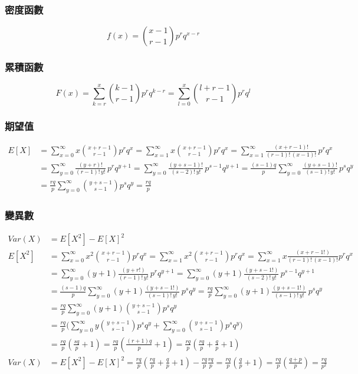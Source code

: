\documentclass{article}
\begin{document}
\subsubsection{密度函數}
\[ f(x)=\binom{x-1}{r-1}p^r q^{x-r} \]

\subsubsection{累積函數}
\[ F(x)=\sum_{k=r}^x{\binom{k-1}{r-1}p^r q^{k-r}}
       =\sum_{l=0}^x{\binom{l+r-1}{r-1}p^r q^l} \]

\subsubsection{期望值}
\begin{align*}
E[X]
& = \sum_{x=0}^\infty{x\binom{x+r-1}{r-1}p^r q^x}
  = \sum_{x=1}^\infty{x\binom{x+r-1}{r-1}p^r q^x}
  = \sum_{x=1}^\infty{\frac{(x+r-1)!}{(r-1)!\,(x-1)!}\,p^r q^x} \\
& = \sum_{y=0}^\infty{\frac{(y+r)!}{(r-1)!\,y!}\,p^r q^{y+1}}
  = \sum_{y=0}^\infty{\frac{(y+s-1)!}{(s-2)!\,y!}\,p^{s-1}q^{y+1}}
  = \frac{(s-1)q}{p}\sum_{y=0}^\infty{\frac{(y+s-1)!}{(s-1)!\,y!}\,p^s q^y} \\
& = \frac{rq}{p}\sum_{y=0}^\infty{\binom{y+s-1}{s-1}p^s q^y}
  = \frac{rq}{p}
\end{align*}

\subsubsection{變異數}
\begin{align*}
Var(X)
& = E[X^2]-E[X]^2 \\
E[X^2] & = \sum_{x=0}^\infty{x^2\binom{x+r-1}{r-1}p^r q^x}
  = \sum_{x=1}^\infty{x^2\binom{x+r-1}{r-1}p^r q^x}
  = \sum_{x=1}^\infty{x\frac{(x+r-1!)}{(r-1)!\,(x-1)!}p^r q^x} \\
& = \sum_{y=0}^\infty{(y+1)\frac{(y+r!)}{(r-1)!\,y!}\,p^r q^{y+1}}
  = \sum_{y=0}^\infty{(y+1)\frac{(y+s-1!)}{(s-2)!\,y!}\,p^{s-1} q^{y+1}} \\
& = \frac{(s-1)q}{p}\sum_{y=0}^\infty{(y+1)\frac{(y+s-1!)}{(s-1)!\,y!}\,p^s q^y}
  = \frac{rq}{p}\sum_{y=0}^\infty{(y+1)\frac{(y+s-1!)}{(s-1)!\,y!}\,p^s q^y} \\
& = \frac{rq}{p}\sum_{y=0}^\infty{(y+1)\binom{y+s-1}{s-1}p^s q^y} \\
& = \frac{rq}{p}\bigg(
  \sum_{y=0}^\infty{y\binom{y+s-1}{s-1}p^s q^y} +
  \sum_{y=0}^\infty{\binom{y+s-1}{s-1}p^s q^y}\bigg) \\
& = \frac{rq}{p}(\frac{sq}{p}+1)
  = \frac{rq}{p}(\frac{(r+1)q}{p}+1)
  = \frac{rq}{p}(\frac{rq}{p}+\frac{q}{p}+1) \\
Var(X) & = E[X^2]-E[X]^2
  = \frac{rq}{p}(\frac{rq}{p}+\frac{q}{p}+1) - \frac{rq}{p}\frac{rq}{p}
  = \frac{rq}{p}(\frac{q}{p}+1)
  = \frac{rq}{p}(\frac{q+p}{p})
  = \frac{rq}{p^2}
\end{align*}
\end{document}
